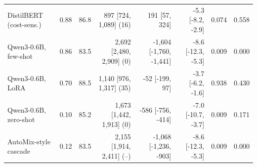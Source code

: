 \begin{tabular}{@{}lrrrrrrr@{}}
DistilBERT (cost-sens.) & 0.88 & 86.8 & 897 [724, 1{,}089] (16) & 191 [57, 324] & -5.3 [-8.2, -2.9] & 0.074 & 0.558 \\
Qwen3-0.6B, few-shot & 0.86 & 83.5 & 2{,}692 [2{,}480, 2{,}909] (0) & -1{,}604 [-1{,}760, -1{,}441] & -8.6 [-12.3, -5.3] & 0.009 & 0.000 \\
Qwen3-0.6B, LoRA & 0.70 & 88.5 & 1{,}140 [976, 1{,}317] (35) & -52 [-199, 97] & -3.7 [-6.2, -1.6] & 0.938 & 0.430 \\
Qwen3-0.6B, zero-shot & 0.10 & 85.2 & 1{,}673 [1{,}442, 1{,}913] (0) & -586 [-756, -414] & -7.0 [-10.7, -3.7] & 0.009 & 0.171 \\
AutoMix-style cascade & 0.12 & 83.5 & 2{,}155 [1{,}914, 2{,}411] (--) & -1{,}068 [-1{,}236, -903] & -8.6 [-12.3, -5.3] & 0.009 & 0.000 \\
\bottomrule
\end{tabular}
